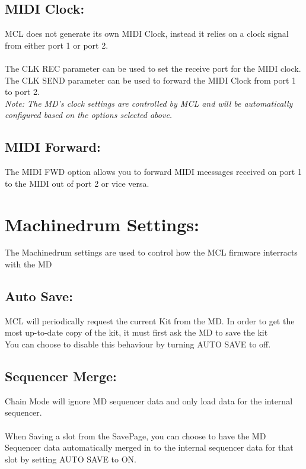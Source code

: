 \subsection{MIDI Clock:}
MCL does not generate its own MIDI Clock, instead it relies on a clock signal from either port 1 or port 2.\\\\
The CLK REC parameter can be used to set the receive port for the MIDI clock.\\
The CLK SEND parameter can be used to forward the MIDI Clock from port 1 to port 2.\\
\textit{Note: The MD's clock settings are controlled by MCL and will be automatically configured based on the options selected above.}

\subsection{MIDI Forward:}
The MIDI FWD option allows you to forward MIDI meessages received on port 1 to the MIDI out of port 2 or vice versa.

\section{Machinedrum Settings:}
The Machinedrum settings are used to control how the MCL firmware interracts with the MD
\\
\subsection{Auto Save:}
MCL will periodically request the current Kit from the MD. In order to get the most up-to-date copy of the kit, it must first ask the MD to save the kit
\\
You can choose to disable this behaviour by turning AUTO SAVE to off.
\subsection{Sequencer Merge:}
Chain Mode will ignore MD sequencer data and only load data for the internal sequencer.\\
\\
When Saving a slot from the SavePage, you can choose to have the MD Sequencer data automatically merged in to the internal sequencer data for that slot by setting AUTO SAVE to ON.
